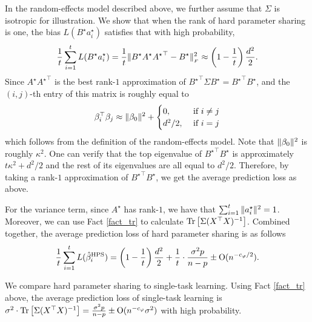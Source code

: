 \begin{example}\label{ex_same_cov}
In the random-effects model described above, we further assume that $\Sigma$ is isotropic for illustration. We show that when the rank of hard parameter sharing is one, the bias $L(B^{\star} a_i^{\star})$ satisfies that with high probability, 
\[ \frac{1}{t} \sum_{i=1}^t L(B^{\star} a_i^{\star}) = \frac{1}{t}\|B^{\star} A^{\star} {A^{\star}}^{\top} - B^{\star}\|_{_{F}}^2 \approx \left(1 - \frac{1}{t}\right) \frac{ d^2}{2}  . \]
Since $A^{\star} {A^{\star}}^{\top}$ is the best rank-$1$ approximation of ${B^{\star}}^{\top}\Sigma B^{\star} = {B^{\star}}^{\top} B^{\star}$, and the $(i, j)$-th entry of this matrix is roughly equal to
\begin{align*}
	\beta_i^{\top} \beta_j \approx \|\beta_0\|^2 + \begin{cases}
																								0, &\text{ if } i \neq j \\
																								d^2/2, &\text{ if } i = j
	\end{cases}
\end{align*}
which follows from the definition of the random-effects model.
Note that $\|\beta_0\|^2$ is roughly $\kappa^2$.
One can verify that the top eigenvalue of ${B^{\star}}^{\top} B^{\star}$ is approximately $t \kappa^2 + d^2/2$ and the rest of its eigenvalues are all equal to $d^2/2$.
Therefore, by taking a rank-$1$ approximation of ${B^{\star}}^{\top} B^{\star}$, we get the average prediction loss as above.

For the variance term, since $A^{\star}$ has rank-$1$, we have that $\sum_{i=1}^t \|a_i^{\star}\|^2 = 1$. Moreover, we can use Fact \ref{fact_tr} to calculate $\operatorname{Tr}\left[\Sigma (X^{\top} X)^{-1}\right]$. 
Combined together, the average prediction loss of hard parameter sharing is as follows
\[ \frac{1}{t}\sum_{i=1}^t L(\hat{\beta}_i^{\textup{HPS}}) = \left({1 - \frac{1}{t}}\right) \frac{d^2}{2} + \frac{1}{t} \cdot \frac{\sigma^2 p}{n - p} \pm \operatorname{O}(n^{-c_{\varphi} / 2}) .\] %
\end{example}
We compare hard parameter sharing to single-task learning.
Using Fact \ref{fact_tr} above, the average prediction loss of single-task learning is $\sigma^2\cdot \operatorname{Tr}\left[\Sigma (X^{\top} X)^{-1}\right] = \frac{\sigma^2 p}{n - p}  \pm \operatorname{O}(n^{-c_\varphi} \sigma^2)$ with high probability.
